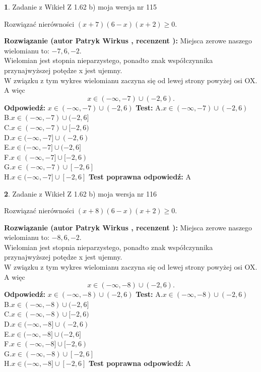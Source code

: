 \documentclass[12pt, a4paper]{article}
\theoremstyle{definition} %
\newtheorem{zad}{}
\newcommand{\zadStart}[1]{\begin{zad}#1\newline}
\newcommand{\zadStop}{\end{zad}}
\newcommand{\rozwStart}[2]{\noindent \textbf{Rozwiązanie (autor #1 , recenzent #2): }\newline}
\newcommand{\rozwStop}{\newline}
\newcommand{\odpStart}{\noindent \textbf{Odpowiedź:}\newline}
\newcommand{\odpStop}{\newline}
\newcommand{\testStart}{\noindent \textbf{Test:}\newline}
\newcommand{\testStop}{\newline}
\newcommand{\kluczStart}{\noindent \textbf{Test poprawna odpowiedź:}\newline}
\newcommand{\kluczStop}{\newline}
\begin{document}
\zadStart{Zadanie z Wikieł Z 1.62 b) moja wersja nr 115}

Rozwiązać nierówności $(x+7)(6-x)(x+2)\ge0$.
\zadStop
\rozwStart{Patryk Wirkus}{}
Miejsca zerowe naszego wielomianu to: $-7, 6, -2$.\\
Wielomian jest stopnia nieparzystego, ponadto znak współczynnika przy\linebreak najwyższej potędze x jest ujemny.\\ W związku z tym wykres wielomianu zaczyna się od lewej strony powyżej osi OX. A więc $$x \in (-\infty,-7) \cup (-2,6).$$
\rozwStop
\odpStart
$x \in (-\infty,-7) \cup (-2,6)$
\odpStop
\testStart
A.$x \in (-\infty,-7) \cup (-2,6)$\\
B.$x \in (-\infty,-7) \cup (-2,6]$\\
C.$x \in (-\infty,-7) \cup [-2,6)$\\
D.$x \in (-\infty,-7] \cup (-2,6)$\\
E.$x \in (-\infty,-7] \cup (-2,6]$\\
F.$x \in (-\infty,-7] \cup [-2,6)$\\
G.$x \in (-\infty,-7) \cup [-2,6]$\\
H.$x \in (-\infty,-7] \cup [-2,6]$
\testStop
\kluczStart
A
\kluczStop



\zadStart{Zadanie z Wikieł Z 1.62 b) moja wersja nr 116}

Rozwiązać nierówności $(x+8)(6-x)(x+2)\ge0$.
\zadStop
\rozwStart{Patryk Wirkus}{}
Miejsca zerowe naszego wielomianu to: $-8, 6, -2$.\\
Wielomian jest stopnia nieparzystego, ponadto znak współczynnika przy\linebreak najwyższej potędze x jest ujemny.\\ W związku z tym wykres wielomianu zaczyna się od lewej strony powyżej osi OX. A więc $$x \in (-\infty,-8) \cup (-2,6).$$
\rozwStop
\odpStart
$x \in (-\infty,-8) \cup (-2,6)$
\odpStop
\testStart
A.$x \in (-\infty,-8) \cup (-2,6)$\\
B.$x \in (-\infty,-8) \cup (-2,6]$\\
C.$x \in (-\infty,-8) \cup [-2,6)$\\
D.$x \in (-\infty,-8] \cup (-2,6)$\\
E.$x \in (-\infty,-8] \cup (-2,6]$\\
F.$x \in (-\infty,-8] \cup [-2,6)$\\
G.$x \in (-\infty,-8) \cup [-2,6]$\\
H.$x \in (-\infty,-8] \cup [-2,6]$
\testStop
\kluczStart
A
\kluczStop
\end{document}
